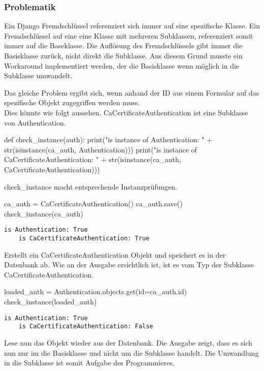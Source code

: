 \subsubsection{Problematik}
Ein Django Fremdschlüssel referenziert sich immer auf eine spezifische Klasse. Ein Fremdschlüssel auf eine eine Klasse mit mehreren Subklassen, referenziert somit immer auf die Baseklasse. Die Auflösung des Fremdschlüssels gibt immer die Basisklasse zurück, nicht direkt die Subklasse. Aus diesem Grund musste ein Workaround implementiert werden, der die Basisklasse wenn möglich in die Subklasse umwandelt.

Das gleiche Problem ergibt sich, wenn anhand der ID aus einem Formular auf das spezifische Objekt zugegriffen werden muss.
\\
Dies könnte wie folgt aussehen. CaCertificateAuthentication ist eine Subklasse von Authentication.
\medskip
\begin{python}
    def check_instance(auth):
        print("is instance of Authentication: " + 
            str(isinstance(ca_auth, Authentication)))
        print("is instance of CaCertificateAuthentication: " + 
            str(isinstance(ca_auth, CaCertificateAuthentication)))
\end{python}
check\_instance macht entsprechende Instanzprüfungen.\\

\begin{python}
    ca_auth = CaCertificateAuthentication()
    ca_auth.save()
    check_instance(ca_auth)
\end{python}

\begin{lstlisting}[style=BashInputStyle]
    is Authentication: True
    is CaCertificateAuthentication: True
\end{lstlisting}    
Erstellt ein  CaCertificateAuthentication Objekt und speichert es in der Datenbank ab. Wie an der Ausgabe ersichtlich ist, ist es vom Typ der Subklasse CaCertificateAuthentication.\\

\begin{python}
    loaded_auth = Authentication.objects.get(id=ca_auth.id)
    check_instance(loaded_auth)
\end{python}
\begin{lstlisting}[style=BashInputStyle]
    is Authentication: True
    is CaCertificateAuthentication: False
\end{lstlisting} 

Lese nun das Objekt wieder aus der Datenbank. Die Ausgabe zeigt, dass es sich nun nur im die Basisklasse und nicht um die Subklasse handelt. Die Umwandlung in die Subklasse ist somit Aufgabe des Programmieres,

